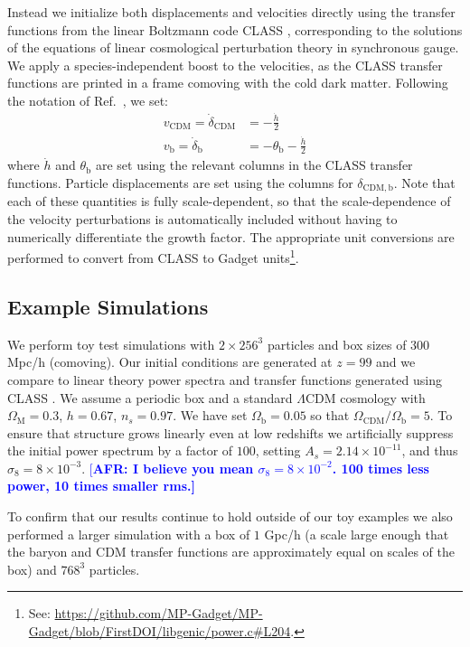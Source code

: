\documentclass[a4paper,11pt]{article}
\newcommand{\AFR}[1]{\textcolor{blue}{[\bf AFR: #1]} }
\begin{document}
Instead we initialize both displacements and velocities directly using the transfer functions from the linear Boltzmann code CLASS \cite{CLASS}, corresponding to the solutions of the equations of linear cosmological perturbation theory in synchronous gauge. We apply a species-independent boost to the velocities, as the CLASS transfer functions are printed in a frame comoving with the cold dark matter. Following the notation of Ref.~\cite{Ma:1995}, we set:
\begin{align}
 v_\mathrm{CDM} = \dot{\delta}_\mathrm{CDM}  &= - \frac{\dot{h}}{2} \\
 v_\mathrm{b} = \dot{\delta}_\mathrm{b}  &= - \theta_\mathrm{b} - \frac{\dot{h}}{2}
\end{align}
where $\dot{h}$ and $\theta_\mathrm{b}$ are set using the relevant columns in the CLASS transfer functions.
Particle displacements are set using the columns for $\delta_\mathrm{CDM, b}$. Note that each of these quantities is fully scale-dependent, so that the scale-dependence of the velocity perturbations is automatically included without having to numerically differentiate the growth factor. The appropriate unit conversions are performed to convert from CLASS to Gadget units\footnote{See: \protect\url{https://github.com/MP-Gadget/MP-Gadget/blob/FirstDOI/libgenic/power.c\#L204}.}.

\subsection{Example Simulations}

We perform toy test simulations with $2\times 256^3$ particles and box sizes of $300$ Mpc/h (comoving). Our initial conditions are generated at $z=99$ and we compare to linear theory power spectra and transfer functions generated using CLASS \cite{CLASS}. We assume a periodic box and a standard $\Lambda$CDM cosmology with $\Omega_\mathrm{M} = 0.3$, $h = 0.67$, $n_s = 0.97$. We have set $\Omega_\mathrm{b} = 0.05$ so that $\Omega_{\mathrm{CDM}}/ \Omega_\mathrm{b} = 5$.
To ensure that structure grows linearly even at low redshifts we artificially suppress the initial power spectrum by a factor of $100$, setting $A_s = 2.14\times 10^{-11}$, and thus $\sigma_8 = 8\times 10^{-3}$.
\AFR{I believe you mean  $\sigma_8 = 8\times 10^{-2}$. 100 times less power, 10 times smaller rms.}

To confirm that our results continue to hold outside of our toy examples we also performed a larger simulation with a box of $1$ Gpc/h (a scale large enough that the baryon and CDM transfer functions are approximately equal on scales of the box) and $768^3$ particles.
\end{document}
